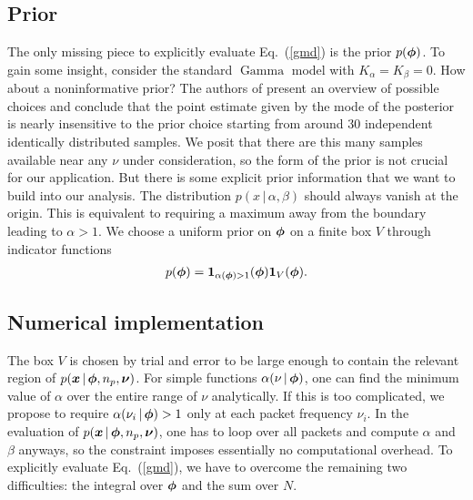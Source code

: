 \documentclass[11pt]{article}
\newcommand{\cond}{\,|\,}
\newcommand{\refeq}[1]{Eq.~(\ref{#1})}
\DeclareMathOperator{\GammaDist}{Gamma}
\newcommand{\Kalpha}{{K_\alpha}}
\newcommand{\Kbeta}{{K_\beta}}
\newcommand{\npack}{n_p}
\begin{document}
\subsection{Prior} \label{sec:priors}

The only missing piece to explicitly evaluate \refeq{gmd} is the prior
$p({\bm{\phi}})$. To gain some insight, consider the standard $\GammaDist$
model with $\Kalpha = \Kbeta = 0$.
How about a noninformative prior? The authors of
\cite{moala2013bayesian} present an overview of possible choices and
conclude that the point estimate given by the mode of the posterior is
nearly insensitive to the prior choice starting from around 30
independent identically distributed samples. We posit that there are
this many samples available near any $\nu$ under consideration, so the
form of the prior is not crucial for our application. But there is
some explicit prior information that we want to build into our
analysis. The distribution $p(x \cond \alpha, \beta)$ should always
vanish at the origin. This is equivalent to requiring a maximum away
from the boundary leading to $\alpha > 1$. We choose a uniform prior
on ${\bm{\phi}}$ on a finite box $V$ through indicator functions
\begin{align}
  p({\bm{\phi}}) = \mathbf{1}_{\alpha({\bm{\phi}}) > 1}({\bm{\phi}}) \mathbf{1}_V({\bm{\phi}}).
\end{align}

\subsection{Numerical implementation} \label{sec:numerical}

The box $V$ is chosen by trial and error to be large enough to contain
the relevant region of $p(\bmx\cond \bmphi, \npack, \bmnu)$. For
simple functions $\alpha(\nu \cond \bmphi)$, one can find the minimum
value of $\alpha$ over the entire range of $\nu$ analytically. If this
is too complicated, we propose to require $\alpha(\nu_i \cond \bmphi)
> 1$ only at each packet frequency $\nu_i$. In the evaluation of
$p(\bmx \cond \bmphi, \npack, \bmnu)$, one has to loop over all
packets and compute $\alpha$ and $\beta$ anyways, so the constraint
imposes essentially no computational overhead.  To explicitly evaluate
\refeq{gmd}, we have to overcome the remaining two difficulties: the
integral over ${\bm{\phi}}$ and the sum over $N$.
\end{document}
